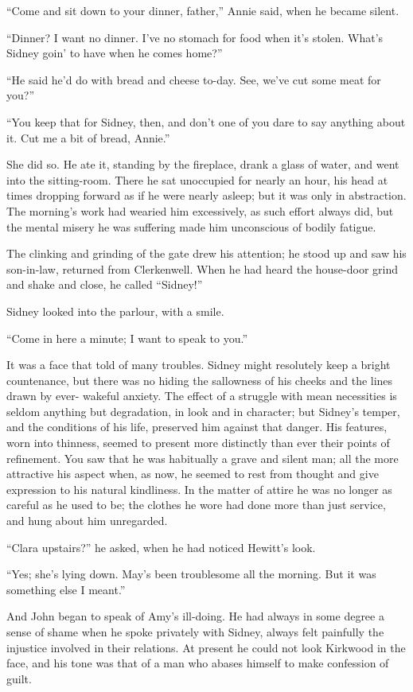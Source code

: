 {}``Come and sit down to your dinner, father,'' Annie said, when he
became silent.

``Dinner? I want no dinner. I've no stomach for food when it's stolen.
What's Sidney goin' to have when he comes home?''

``He said he'd do with bread and cheese to-day. See, we've cut some meat
for you?''

``You keep that for Sidney, then, and don't one of you dare to say
anything about it. Cut me a bit of bread, Annie.''

She did so. He ate it, standing by the fireplace, drank a glass of
water, and went into the sitting-room. There he sat unoccupied for
nearly an hour, his head at times dropping forward as if he were nearly
asleep; but it was only in abstraction. The morning's work had wearied
him excessively, as such effort always did, but the mental misery he was
suffering made him unconscious of bodily fatigue.

The clinking and grinding of the gate drew his attention; he stood up
and saw his son-in-law, returned from Clerkenwell. When he had heard the
house-door grind and shake and close, he called ``Sidney!''

Sidney looked into the parlour, with a smile.

{}``Come in here a minute; I want to speak to you.''

It was a face that told of many troubles. Sidney might resolutely keep a
bright countenance, but there was no hiding the sallowness of his cheeks
and the lines drawn by ever- wakeful anxiety. The effect of a struggle
with mean necessities is seldom anything but degradation, in look and in
character; but Sidney's temper, and the conditions of his life,
preserved him against that danger. His features, worn into thinness,
seemed to present more distinctly than ever their points of refinement.
You saw that he was habitually a grave and silent man; all the more
attractive his aspect when, as now, he seemed to rest from thought and
give expression to his natural kindliness. In the matter of attire he
was no longer as careful as he used to be; the clothes he wore had done
more than just service, and hung about him unregarded.

``Clara upstairs?'' he asked, when he had noticed Hewitt's look.

``Yes; she's lying down. May's been troublesome all the morning. But it
was something else I meant.''

{}And John began to speak of Amy's ill-doing. He had always in some
degree a sense of shame when he spoke privately with Sidney, always felt
painfully the injustice involved in their relations. At present he could
not look Kirkwood in the face, and his tone was that of a man who abases
himself to make confession of guilt.

